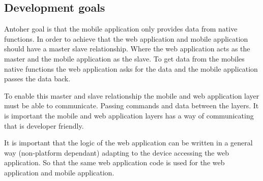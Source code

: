 \subsection{Development goals} \label{subsection-development-goals}
Antoher goal is that the mobile application only provides data from native functions. In order to achieve that the web application and mobile application should have a master slave relationship. Where the web application acts as the master and the mobile application as the slave. To get data from the mobiles native functions the web application asks for the data and the mobile application passes the data back.

To enable this master and slave relationship the mobile and web application layer must be able to communicate. Passing commands and data between the layers. It is important the mobile and web application layers has a way of communicating that is developer friendly. 

It is important that the logic of the web application can be written in a general way (non-platform dependant) adapting to the device accessing the web application. So that the same web application code is used for the web application and mobile application.